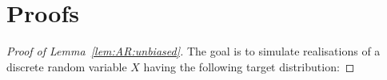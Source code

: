 \documentclass[12pt]{article}
\newcommand{\eqsp}{\;}
\newcommand{\1}{\mathrm{1}}
\begin{document}
\section{Proofs}
\begin{proof}[Proof of Lemma~\ref{lem:AR:unbiased}]
%
The goal is to simulate realisations of  a discrete random variable $X$ having the following target distribution:

\end{proof}
\end{document}
